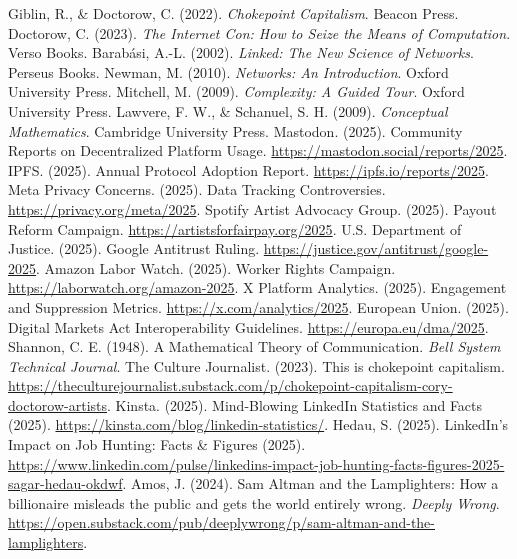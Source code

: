 \documentclass{article}
\begin{document}
\begin{thebibliography}{9}
 Giblin, R., \& Doctorow, C. (2022). \textit{Chokepoint Capitalism}. Beacon Press.
 Doctorow, C. (2023). \textit{The Internet Con: How to Seize the Means of Computation}. Verso Books.
 Barabási, A.-L. (2002). \textit{Linked: The New Science of Networks}. Perseus Books.
 Newman, M. (2010). \textit{Networks: An Introduction}. Oxford University Press.
 Mitchell, M. (2009). \textit{Complexity: A Guided Tour}. Oxford University Press.
 Lawvere, F. W., \& Schanuel, S. H. (2009). \textit{Conceptual Mathematics}. Cambridge University Press.
 Mastodon. (2025). Community Reports on Decentralized Platform Usage. \url{https://mastodon.social/reports/2025}.
 IPFS. (2025). Annual Protocol Adoption Report. \url{https://ipfs.io/reports/2025}.
 Meta Privacy Concerns. (2025). Data Tracking Controversies. \url{https://privacy.org/meta/2025}.
 Spotify Artist Advocacy Group. (2025). Payout Reform Campaign. \url{https://artistsforfairpay.org/2025}.
 U.S. Department of Justice. (2025). Google Antitrust Ruling. \url{https://justice.gov/antitrust/google-2025}.
 Amazon Labor Watch. (2025). Worker Rights Campaign. \url{https://laborwatch.org/amazon-2025}.
 X Platform Analytics. (2025). Engagement and Suppression Metrics. \url{https://x.com/analytics/2025}.
 European Union. (2025). Digital Markets Act Interoperability Guidelines. \url{https://europa.eu/dma/2025}.
 Shannon, C. E. (1948). A Mathematical Theory of Communication. \textit{Bell System Technical Journal}.
 The Culture Journalist. (2023). This is chokepoint capitalism. \url{https://theculturejournalist.substack.com/p/chokepoint-capitalism-cory-doctorow-artists}.
 Kinsta. (2025). Mind-Blowing LinkedIn Statistics and Facts (2025). \url{https://kinsta.com/blog/linkedin-statistics/}.
 Hedau, S. (2025). LinkedIn's Impact on Job Hunting: Facts \& Figures (2025). \url{https://www.linkedin.com/pulse/linkedins-impact-job-hunting-facts-figures-2025-sagar-hedau-okdwf}.
 Amos, J. (2024). Sam Altman and the Lamplighters: How a billionaire misleads the public and gets the world entirely wrong. \textit{Deeply Wrong}. \url{https://open.substack.com/pub/deeplywrong/p/sam-altman-and-the-lamplighters}.
\end{thebibliography}
\end{document}
